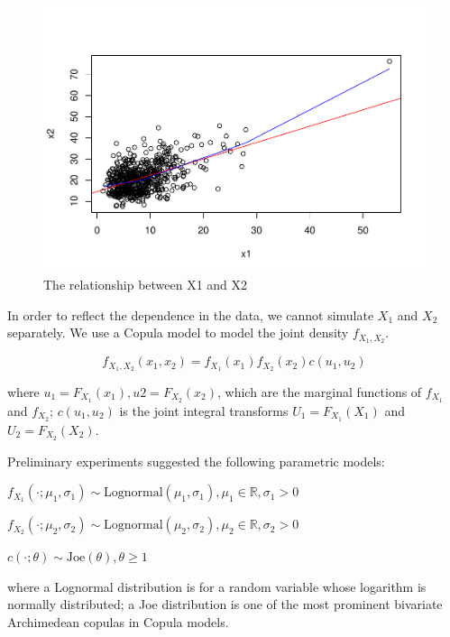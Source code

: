 \documentclass[11pt,]{article}
\begin{document}
\begin{figure}
\centering
\includegraphics{figs/unnamed-chunk-2.pdf}
\caption{The relationship between X1 and X2}
\end{figure}

In order to reflect the dependence in the data, we cannot simulate
\(X_1\) and \(X_2\) separately. We use a Copula model to model the joint
density \(f_{X_{1}, X_{2}}\).

\[
f_{X_{1}, X_{2}}\left(x_{1}, x_{2}\right)=f_{X_{1}}\left(x_{1}\right) f_{X_{2}}\left(x_{2}\right) c\left(u_1,u_2\right)
\]

where
\(u_1 = F_{X_{1}}\left(x_{1}\right),u2= F_{X_{2}}\left(x_{2}\right)\),
which are the marginal functions of \(f_{X_{1}}\) and \(f_{X_{2}}\);
\(c\left(u_{1}, u_{2}\right)\) is the joint integral transforms
\(U_{1}=F_{X_{1}}\left(X_{1}\right)\) and
\(U_{2}=F_{X_{2}}\left(X_{2}\right)\).

Preliminary experiments suggested the following parametric models:

\(f_{X_{1}}\left(\cdot ; \mu_{1}, \sigma_{1}\right) \sim \textrm{Lognormal} \left(\mu_{1}, \sigma_{1}\right), \mu_{1} \in \mathbb{R}, \sigma_{1}>0\)

\(f_{X_{2}}\left(\cdot ; \mu_{2}, \sigma_{2}\right) \sim \textrm{Lognormal} \left(\mu_{2}, \sigma_{2}\right), \mu_{2} \in \mathbb{R}, \sigma_{2}>0\)

\(c(\cdot ; \theta) \sim \textrm{Joe}(\theta), \theta \geq 1\)

where a Lognormal distribution is for a random variable whose logarithm
is normally distributed; a Joe distribution is one of the most prominent
bivariate Archimedean copulas in Copula models.
\end{document}
